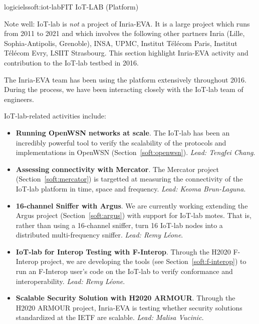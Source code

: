 \documentclass{ra2016}
\begin{document}
\begin{module}{logiciels}{soft:iot-lab}{FIT IoT-LAB (Platform)} 

\begin{participants}
\end{participants}

Note well: IoT-lab is \textit{not} a project of Inria-EVA.
It is a large project which runs from 2011 to 2021 and which involves the following other partners Inria (Lille, Sophia-Antipolis, Grenoble), INSA, UPMC, Institut T\'el\'ecom Paris, Institut T\'el\'ecom Evry, LSIIT Strasbourg.
This section highlight Inria-EVA activity and contribution to the IoT-lab testbed in 2016.

The Inria-EVA team has been using the platform extensively throughout 2016.
During the process, we have been interacting closely with the IoT-lab team of engineers.

IoT-lab-related activities include:

\begin{itemize}
    \item \textbf{Running OpenWSN networks at scale}.
        The IoT-lab has been an incredibly powerful tool to verify the scalability of the protocols and implementations in OpenWSN (Section~\ref{soft:openwsn}).
        \textit{Lead: Tengfei Chang}.
    \item \textbf{Assessing connectivity with Mercator}.
        The Mercator project (Section~\ref{soft:mercator}) is targetted at measuring the connectivity of the IoT-lab platform in time, space and frequency.
        \textit{Lead: Keoma Brun-Laguna}.
    \item \textbf{16-channel Sniffer with Argus}.
        We are currently working extending the Argus project (Section~\ref{soft:argus}) with support for IoT-lab motes.
        That is, rather than using a 16-channel sniffer, turn 16 IoT-lab nodes into a distributed multi-frequency sniffer.
        \textit{Lead: Remy L\'eone}.
    \item \textbf{IoT-lab for Interop Testing with F-Interop}.
        Through the H2020 F-Interop project, we are developing the tools (see Section~\ref{soft:f-interop}) to run an F-Interop user's code on the IoT-lab to verify conformance and interoperability.
        \textit{Lead: Remy L\'eone}.
    \item \textbf{Scalable Security Solution with H2020 ARMOUR}.
        Through the H2020 ARMOUR project, Inria-EVA is testing whether security solutions standardized at the IETF are scalable.
        \textit{Lead: Malisa Vucinic}.
\end{itemize}

\end{module}
\end{document}
